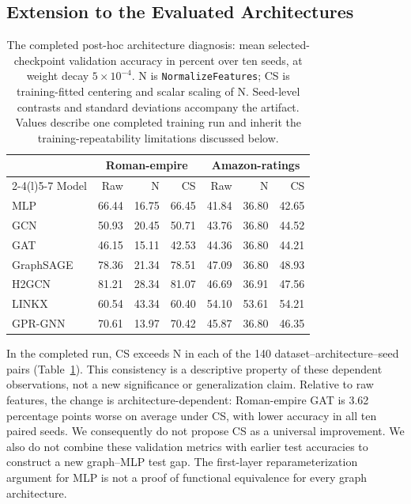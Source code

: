 \subsection{Extension to the Evaluated Architectures}

\begin{table}[ht]
\centering
\caption{The completed post-hoc architecture diagnosis: mean selected-checkpoint validation accuracy in percent over ten seeds, at weight decay $5\times10^{-4}$. N is \texttt{NormalizeFeatures}; CS is training-fitted centering and scalar scaling of N. Seed-level contrasts and standard deviations accompany the artifact. Values describe one completed training run and inherit the training-repeatability limitations discussed below.}
\label{tab:graph_parameterization}
\small
\begin{tabular}{@{}lrrrrrr@{}}
\toprule
& \multicolumn{3}{c}{Roman-empire} & \multicolumn{3}{c}{Amazon-ratings} \\
\cmidrule(lr){2-4}\cmidrule(l){5-7}
Model & Raw & N & CS & Raw & N & CS \\
\midrule
MLP & 66.44 & 16.75 & 66.45 & 41.84 & 36.80 & 42.65 \\
GCN & 50.93 & 20.45 & 50.71 & 43.76 & 36.80 & 44.52 \\
GAT & 46.15 & 15.11 & 42.53 & 44.36 & 36.80 & 44.21 \\
GraphSAGE & 78.36 & 21.34 & 78.51 & 47.09 & 36.80 & 48.93 \\
H2GCN & 81.21 & 28.34 & 81.07 & 46.69 & 36.91 & 47.56 \\
LINKX & 60.54 & 43.34 & 60.40 & 54.10 & 53.61 & 54.21 \\
GPR-GNN & 70.61 & 13.97 & 70.42 & 45.87 & 36.80 & 46.35 \\
\bottomrule
\end{tabular}
\end{table}

In the completed run, CS exceeds N in each of the 140 dataset--architecture--seed pairs (Table~\ref{tab:graph_parameterization}). This consistency is a descriptive property of these dependent observations, not a new significance or generalization claim. Relative to raw features, the change is architecture-dependent: Roman-empire GAT is 3.62 percentage points worse on average under CS, with lower accuracy in all ten paired seeds. We consequently do not propose CS as a universal improvement. We also do not combine these validation metrics with earlier test accuracies to construct a new graph--MLP test gap. The first-layer reparameterization argument for MLP is not a proof of functional equivalence for every graph architecture.

